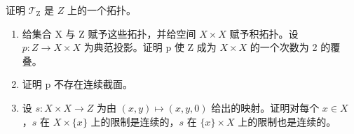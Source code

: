 证明 \(\mathcal{T}_{\mathrm{Z}}\) 是 \(Z\) 上的一个拓扑。

\begin{enumerate}
\def\labelenumi{\alph{enumi})}
\setcounter{enumi}{2}
\item
  给集合 X 与 Z 赋予这些拓扑，并给空间 \(X \times X\) 赋予积拓扑。设 \(p: Z \to X \times X\) 为典范投影。证明 p 使 Z 成为 \(X \times X\) 的一个次数为 2 的覆叠。
\item
  证明 p 不存在连续截面。
\item
  设 \(s: X \times X \to Z\) 为由 \((x, y) \mapsto (x, y, 0)\) 给出的映射。证明对每个 \(x \in X\) ，\(s\) 在 \(X \times \{x\}\) 上的限制是连续的，\(s\) 在 \(\{x\} \times X\) 上的限制也是连续的。
\end{enumerate}

